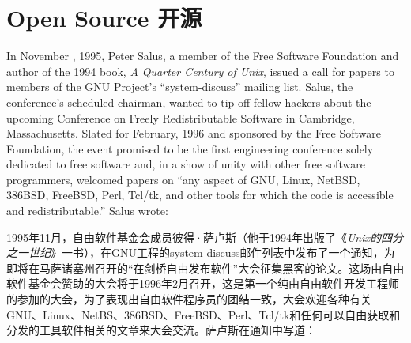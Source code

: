 
\chapter{\ifdefined\eng
Open Source
\fi
\ifdefined\chs
开源
\fi} \label{chapter:open source}



\ifdefined\eng
In November , 1995, Peter Salus, a member of the Free Software Foundation and author of the 1994 book, \textit{A Quarter Century of Unix}, issued a call for papers to members of the GNU Project's ``system-discuss'' mailing list. Salus, the conference's scheduled chairman, wanted to tip off fellow hackers about the upcoming Conference on Freely Redistributable Software in Cambridge, Massachusetts. Slated for February, 1996 and sponsored by the Free Software Foundation, the event promised to be the first engineering conference solely dedicated to free software and, in a show of unity with other free software programmers, welcomed papers on ``any aspect of GNU, Linux, NetBSD, 386BSD, FreeBSD, Perl, Tcl/tk, and other tools for which the code is accessible and redistributable.'' Salus wrote:
\fi

\ifdefined\chs
1995年11月，自由软件基金会成员彼得·萨卢斯（他于1994年出版了《\textit{Unix的四分之一世纪}》一书），在GNU工程的system-discuss邮件列表中发布了一个通知，为即将在马萨诸塞州召开的“在剑桥自由发布软件”大会征集黑客的论文。这场由自由软件基金会赞助的大会将于1996年2月召开，这是第一个纯由自由软件开发工程师的参加的大会，为了表现出自由软件程序员的团结一致，大会欢迎各种有关GNU、Linux、NetBS、386BSD、FreeBSD、Perl、Tcl/tk和任何可以自由获取和分发的工具软件相关的文章来大会交流。萨卢斯在通知中写道：
\fi

